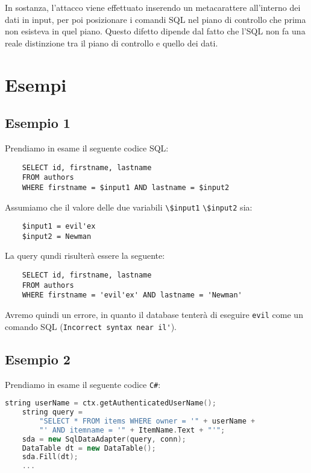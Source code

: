 In sostanza, l'attacco viene effettuato inserendo un metacarattere all'interno
dei dati in input, per poi
posizionare i comandi SQL nel piano di controllo che prima non esisteva in quel
piano.
Questo difetto dipende dal fatto che l'SQL non fa una reale distinzione tra il
piano di controllo
e quello dei dati.

\section{Esempi}

\subsection{Esempio 1}

Prendiamo in esame il seguente codice SQL:

\begin{lstlisting}
    SELECT id, firstname, lastname
    FROM authors
    WHERE firstname = $input1 AND lastname = $input2
\end{lstlisting}

Assumiamo che il valore delle due variabili \verb|\$input1| \verb|\$input2|
sia:

\begin{lstlisting}
    $input1 = evil'ex
    $input2 = Newman
\end{lstlisting}

La query qundi risulterà essere la seguente:

\begin{lstlisting}
    SELECT id, firstname, lastname
    FROM authors
    WHERE firstname = 'evil'ex' AND lastname = 'Newman'
\end{lstlisting}

Avremo quindi un errore, in quanto il database tenterà di eseguire \verb|evil|
come un comando SQL (\verb|Incorrect syntax near il'|).

\subsection{Esempio 2}

Prendiamo in esame il seguente codice \verb|C#|:

\begin{lstlisting}[language=C++]
    string userName = ctx.getAuthenticatedUserName();
    string query = 
        "SELECT * FROM items WHERE owner = '" + userName + 
        "' AND itemname = '" + ItemName.Text + "'";
    sda = new SqlDataAdapter(query, conn);
    DataTable dt = new DataTable();
    sda.Fill(dt);
    ...
\end{lstlisting}

